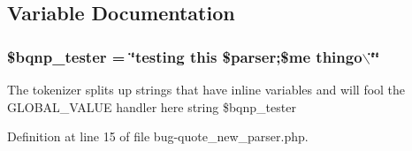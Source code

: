 \subsection{\-Variable \-Documentation}
\hypertarget{bug-quote__new__parser_8php_afa2df248b7dffc6762a717e2f414df7c}{
\subsubsection[{\$bqnp\-\_\-tester}]{\setlength{\rightskip}{0pt plus 5cm}\${\bf bqnp\-\_\-tester} = \char`\"{}testing this \$parser;\$me thingo$\backslash$\char`\"{}\char`\"{}}}\label{bug-quote__new__parser_8php_afa2df248b7dffc6762a717e2f414df7c}
\-The tokenizer splits up strings that have inline variables and will fool the \-G\-L\-O\-B\-A\-L\-\_\-\-V\-A\-L\-U\-E handler here  string \$bqnp\-\_\-tester 

\-Definition at line 15 of file bug-\/quote\-\_\-new\-\_\-parser.\-php.

